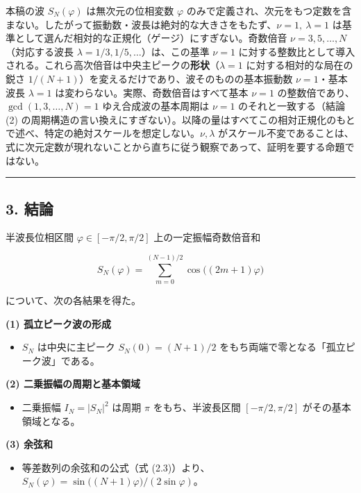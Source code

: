 \documentclass[
]{ltjsarticle}
\providecommand{\tightlist}{%
  \setlength{\itemsep}{0pt}\setlength{\parskip}{0pt}}
\begin{document}
本稿の波 \(S_N(\varphi)\) は無次元の位相変数 \(\varphi\)
のみで定義され、次元をもつ定数を含まない。したがって振動数・波長は絶対的な大きさをもたず、\(\nu=1,\ \lambda=1\)
は基準として選んだ相対的な正規化（ゲージ）にすぎない。奇数倍音
\(\nu=3,5,\dots,N\)（対応する波長
\(\lambda=1/3,1/5,\dots\)）は、この基準 \(\nu=1\)
に対する整数比として導入される。これら高次倍音は中央主ピークの\textbf{形状}（\(\lambda=1\)
に対する相対的な局在の鋭さ
\(1/(N+1)\)）を変えるだけであり、波そのものの基本振動数
\(\nu=1\)・基本波長 \(\lambda=1\)
は変わらない。実際、奇数倍音はすべて基本 \(\nu=1\)
の整数倍であり、\(\gcd(1,3,\dots,N)=1\) ゆえ合成波の基本周期は \(\nu=1\)
のそれと一致する（結論(2)
の周期構造の言い換えにすぎない）。以降の量はすべてこの相対正規化のもとで述べ、特定の絶対スケールを想定しない。\(\nu,\lambda\)
がスケール不変であることは、式に次元定数が現れないことから直ちに従う観察であって、証明を要する命題ではない。

\begin{center}\rule{0.5\linewidth}{0.5pt}\end{center}

\subsection{3. 結論}\label{ux7d50ux8ad6}

半波長位相区間 \(\varphi\in[-\pi/2,\pi/2]\) 上の一定振幅奇数倍音和

\[
S_N(\varphi)=\sum_{m=0}^{(N-1)/2}\cos\!\big((2m+1)\varphi\big)
\]

について、次の各結果を得た。

\textbf{(1) 孤立ピーク波の形成}

\begin{itemize}
\tightlist
\item
  \(S_N\) は中央に主ピーク \(S_N(0)=(N+1)/2\)
  をもち両端で零となる「孤立ピーク波」である。
\end{itemize}

\textbf{(2) 二乗振幅の周期と基本領域}

\begin{itemize}
\tightlist
\item
  二乗振幅 \(I_N=|S_N|^2\) は周期 \(\pi\) をもち、半波長区間
  \([-\pi/2,\pi/2]\) がその基本領域となる。
\end{itemize}

\textbf{(3) 余弦和}

\begin{itemize}
\tightlist
\item
  等差数列の余弦和の公式（式
  (2.3)）より、\(S_N(\varphi)=\sin\!\big((N+1)\varphi\big)/(2\sin\varphi)\)。
\end{itemize}
\end{document}
